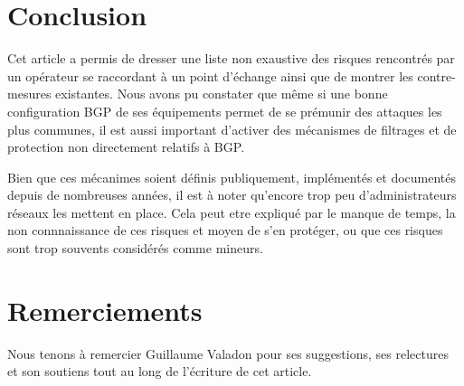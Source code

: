 \section{Conclusion}

Cet article a permis de dresser une liste non exaustive des risques rencontrés par un opérateur se raccordant à un point d'échange ainsi que de montrer les contre-mesures existantes.
Nous avons pu constater que même si une bonne configuration BGP de ses équipements permet de se prémunir des attaques les plus communes, il est aussi important d'activer des mécanismes de filtrages et de protection non directement relatifs à BGP.

Bien que ces mécanimes soient définis publiquement, implémentés et documentés depuis de nombreuses années, il est à noter qu'encore trop peu d'administrateurs réseaux les mettent en place. Cela peut etre expliqué par le manque de temps, la non connnaissance de ces risques et moyen de s'en protéger, ou que ces risques sont trop souvents considérés comme mineurs.

\section{Remerciements}
Nous tenons à remercier Guillaume Valadon pour ses suggestions, ses relectures et son soutiens tout au long de l'écriture de cet article.




